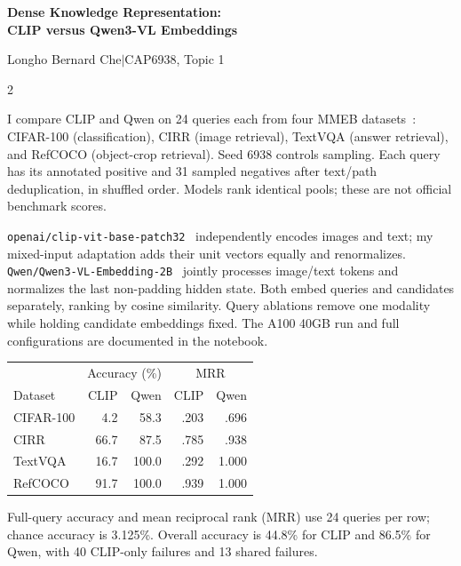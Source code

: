 \documentclass[10pt,letterpaper]{article}
\newcommand{\heading}[1]{\par\addvspace{5pt}\noindent{\normalsize\bfseries #1}\par\nobreak}
\begin{document}
\begin{center}
{\Large\bfseries Dense Knowledge Representation:\\[2pt]
CLIP versus Qwen3-VL Embeddings}\par
\vspace{3pt}
Longho Bernard Che\quad $\vert$\quad CAP6938, Topic 1
\end{center}
\vspace{-8pt}
\begin{multicols}{2}
\heading{1. Experimental setup}
I compare CLIP and Qwen on 24 queries each from four MMEB datasets~\cite{mmeb}:
CIFAR-100 (classification), CIRR (image retrieval), TextVQA (answer retrieval),
and RefCOCO (object-crop retrieval). Seed 6938 controls sampling. Each query has
its annotated positive and 31 sampled negatives after text/path deduplication,
in shuffled order. Models rank identical pools; these are not official benchmark
scores.

\texttt{openai/clip-vit-base-patch32}~\cite{clip} independently encodes images
and text; my mixed-input adaptation adds their unit vectors equally and
renormalizes. \texttt{Qwen/Qwen3-VL-Embedding-2B}~\cite{qwen} jointly processes
image/text tokens and normalizes the last non-padding hidden state. Both embed
queries and candidates separately, ranking by cosine similarity. Query ablations
remove one modality while holding candidate embeddings fixed. The A100 40GB run and full
configurations are documented in the notebook.

\heading{2. Results}
\begin{center}
\small
\begin{tabular}{@{}lrrrr@{}}
\toprule
& \multicolumn{2}{c}{Accuracy (\%)} & \multicolumn{2}{c}{MRR}\\
Dataset & CLIP & Qwen & CLIP & Qwen\\
\midrule
CIFAR-100 & 4.2 & 58.3 & .203 & .696\\
CIRR      & 66.7 & 87.5 & .785 & .938\\
TextVQA   & 16.7 & 100.0 & .292 & 1.000\\
RefCOCO   & 91.7 & 100.0 & .939 & 1.000\\
\bottomrule
\end{tabular}
\end{center}
\vspace{-5pt}
Full-query accuracy and mean reciprocal rank (MRR) use 24 queries per row;
chance accuracy is 3.125\%. Overall accuracy is 44.8\% for CLIP and 86.5\% for
Qwen, with 40 CLIP-only failures and 13 shared failures.


\end{multicols}
\end{document}

